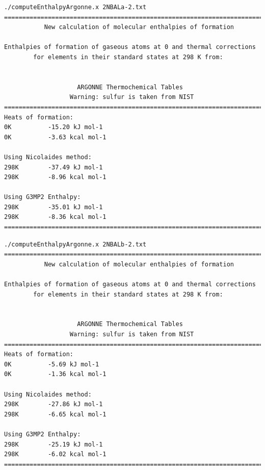 \begin{lstlisting}[caption = Output de 2NBALa-2.txt en EnthalpyArgonne]
./computeEnthalpyArgonne.x 2NBALa-2.txt
========================================================================
           New calculation of molecular enthalpies of formation                               
                                                                                                   
Enthalpies of formation of gaseous atoms at 0 and thermal corrections 
        for elements in their standard states at 298 K from:
                                                                                                                  
          
                    ARGONNE Thermochemical Tables                                    
                  Warning: sulfur is taken from NIST                                                                                                       
========================================================================
Heats of formation:
0K          -15.20 kJ mol-1
0K          -3.63 kcal mol-1

Using Nicolaides method:
298K        -37.49 kJ mol-1
298K        -8.96 kcal mol-1

Using G3MP2 Enthalpy:
298K        -35.01 kJ mol-1
298K        -8.36 kcal mol-1
========================================================================
\end{lstlisting}

\newpage

\begin{lstlisting}[caption = Output de 2NBALb-2.txt en EnthalpyArgonne]
./computeEnthalpyArgonne.x 2NBALb-2.txt
========================================================================
           New calculation of molecular enthalpies of formation                               
                                                                                                   
Enthalpies of formation of gaseous atoms at 0 and thermal corrections 
        for elements in their standard states at 298 K from:
                                                                                                                  
          
                    ARGONNE Thermochemical Tables                                    
                  Warning: sulfur is taken from NIST                                                                                                       
========================================================================
Heats of formation:
0K          -5.69 kJ mol-1
0K          -1.36 kcal mol-1

Using Nicolaides method:
298K        -27.86 kJ mol-1
298K        -6.65 kcal mol-1

Using G3MP2 Enthalpy:
298K        -25.19 kJ mol-1
298K        -6.02 kcal mol-1
========================================================================
\end{lstlisting}

